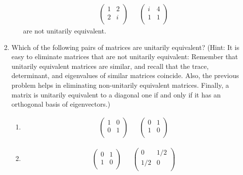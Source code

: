 \documentclass[../psets.tex]{subfiles}
\begin{document}
\begin{enumerate}[label={\textbf{6.\arabic*.}}]
\begin{enumerate}
        \begin{align*}
            \begin{pmatrix}
                1 & 2\\
                2 & i\\
            \end{pmatrix}&&
            \begin{pmatrix}
                i & 4\\
                1 & 1\\
            \end{pmatrix}
        \end{align*}
        are not unitarily equivalent.
    \end{enumerate}
    \item Which of the following pairs of matrices are unitarily equivalent? (Hint: It is easy to eliminate matrices that are not unitarily equivalent: Remember that unitarily equivalent matrices are similar, and recall that the trace, determinant, and eigenvalues of similar matrices coincide. Also, the previous problem helps in eliminating non-unitarily equivalent matrices. Finally, a matrix is unitarily equivalent to a diagonal one if and only if it has an orthogonal basis of eigenvectors.)
    \begin{enumerate}
        \item 
        \begin{align*}
            \begin{pmatrix}
                1 & 0\\
                0 & 1\\
            \end{pmatrix}&&
            \begin{pmatrix}
                0 & 1\\
                1 & 0\\
            \end{pmatrix}
        \end{align*}
        \item 
        \begin{align*}
            \begin{pmatrix}
                0 & 1\\
                1 & 0\\
            \end{pmatrix}&&
            \begin{pmatrix}
                0 & 1/2\\
                1/2 & 0\\

\end{pmatrix}
\end{align*}
\end{enumerate}
\end{enumerate}
\end{document}
